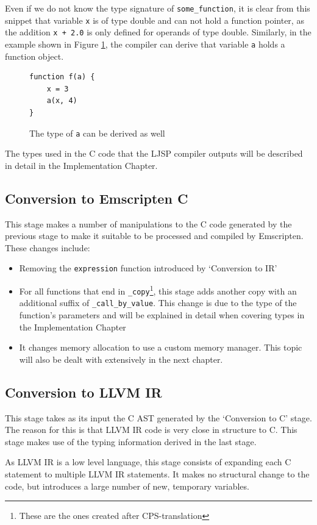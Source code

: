 \documentclass[11pt]{report}
\begin{document}
Even if we do not know the type signature of \texttt{some_function}, it is clear from this snippet that variable \texttt{x} is of type double and can not hold a function pointer, as the addition \texttt{x + 2.0} is only defined for operands of type double. Similarly, in the example shown in Figure \ref{convc2}, the compiler can derive that variable \texttt{a} holds a function object.
\begin{figure}[ht]
\begin{lstlisting}
function f(a) {
    x = 3
    a(x, 4)
}
\end{lstlisting}
\caption{The type of \texttt{a} can be derived as well}
\label{convc2}
\end{figure}

The types used in the C code that the LJSP compiler outputs will be described in detail in the Implementation Chapter.

\subsection{Conversion to Emscripten C}
This stage makes a number of manipulations to the C code generated by the previous stage to make it suitable to be processed and compiled by Emscripten. These changes include:
\begin{itemize}
\item Removing the \texttt{expression} function introduced by `Conversion to IR'
\item For all functions that end in \texttt{_copy}\footnote{These are the ones created after CPS-translation}, this stage adds another copy with an additional suffix of \texttt{_call_by_value}. This change is due to the type of the function's parameters and will be explained in detail when covering types in the Implementation Chapter
\item It changes memory allocation to use a custom memory manager. This topic will also be dealt with extensively in the next chapter.
\end{itemize}

\subsection{Conversion to LLVM IR}
This stage takes as its input the C AST generated by the `Conversion to C' stage. The reason for this is that LLVM IR code is very close in structure to C. This stage makes use of the typing information derived in the last stage.

As LLVM IR is a low level language, this stage consists of expanding each C statement to multiple LLVM IR statements. It makes no structural change to the code, but introduces a large number of new, temporary variables.
\end{document}
